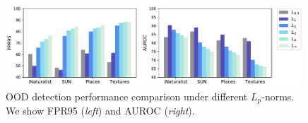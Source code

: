 \documentclass{article}
\begin{document}
\begin{figure}[h]
    \centering
    \includegraphics[width=0.99\textwidth]{figures/all_norm_fpr95_auroc.pdf}
    \caption{\small{OOD detection performance comparison under different $L_p$-norms. We show FPR95 (\emph{left}) and AUROC (\emph{right}).}}
    \label{fig:norm_ablation}
\end{figure}


\end{document}
